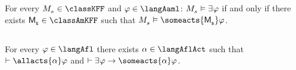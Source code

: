 \begin{corollary}
For every $\kPModel{\kStateS} \in \classKFF$ and $\phi \in \langAaml$: $\kPModel{\kStateS} \entails \somerefs \phi$ if and only if there exists $\aPModel{\aStateS} \in \classAmKFF$ such that $\kPModel{\kStateS} \entails \someacts{\aPModel{\aStateS}} \phi$.
\end{corollary}

\subsection{\classS{}}

\begin{proposition}\label{afl-s-synthesis}
For every $\phi \in \langAfl$ there exists $\alpha \in \langAflAct$ such that $\proves \allacts{\alpha} \phi$ and $\proves \somerefs \phi \implies \someacts{\alpha} \phi$.
\end{proposition}

